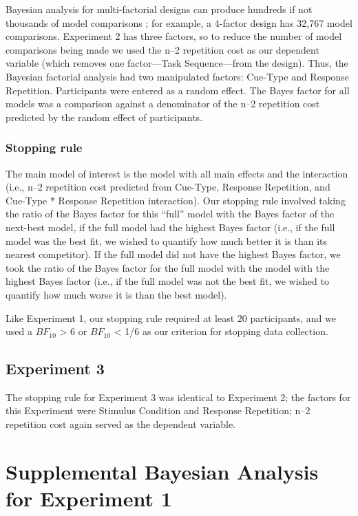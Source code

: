 \documentclass[a4paper, doc, natbib]{apa6}
\begin{document}
Bayesian analysis for multi-factorial designs can produce hundreds if not thousands of model comparisons \citep[see][]{Rouderinpress}; for example, a 4-factor design has 32,767 model comparisons. Experiment 2 has three factors, so to reduce the number of model comparisons being made we used the n--2 repetition cost as our dependent variable (which removes one factor---Task Sequence---from the design). Thus, the Bayesian factorial analysis had two manipulated factors: Cue-Type and Response Repetition. Participants were entered as a random effect. The Bayes factor for all models was a comparison against a denominator of the n--2 repetition cost predicted by the random effect of participants.

\subsubsection{Stopping rule}
The main model of interest is the model with all main effects and the interaction (i.e., n--2 repetition cost predicted from Cue-Type, Response Repetition, and Cue-Type * Response Repetition interaction). Our stopping rule involved taking the ratio of the Bayes factor for this ``full'' model with the Bayes factor of the next-best model, if the full model had the highest Bayes factor (i.e., if the full model was the best fit, we wished to quantify how much better it is than its nearest competitor). If the full model did not have the highest Bayes factor, we took the ratio of the Bayes factor for the full model with the model with the highest Bayes factor (i.e., if the full model was not the best fit, we wished to quantify how much worse it is than the best model).

Like Experiment 1, our stopping rule required at least 20 participants, and we used a $BF_{10}$ > 6 or $BF_{10}$ < 1/6 as our criterion for stopping data collection. 



\subsection{Experiment 3}
The stopping rule for Experiment 3 was identical to Experiment 2; the factors for this Experiment were Stimulus Condition and Response Repetition; n--2 repetition cost again served as the dependent variable.


\appendix
\section{Supplemental Bayesian Analysis for Experiment 1}
\end{document}
